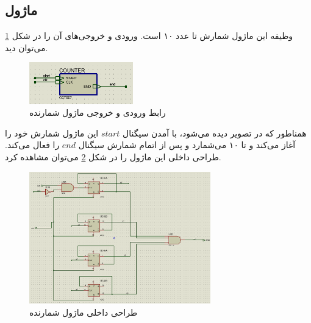 \documentclass[12pt,onecolumn,a4paper,fleqn]{article}
\begin{document}
	\subsection{ماژول }
	وظیفه این ماژول شمارش تا عدد ۱۰ است. ورودی و خروجی‌های آن را در شکل \ref{fig:counter} می‌توان دید.
	\begin{figure}[H]
		\centering
		\includegraphics[width=0.4\textwidth]{source/counter.png}
		\caption{رابط ورودی و خروجی ماژول شمارنده}
		\label{fig:counter}
	\end{figure}
	همناطور که در تصویر دیده می‌شود، با آمدن سیگنال $start$ این ماژول شمارش خود را آغاز می‌کند و تا ۱۰ می‌شمارد و پس از اتمام شمارش سیگنال $end$ را فعال می‌کند. طراحی داخلی این ماژول را در شکل \ref{fig:counter-in} می‌توان مشاهده کرد.
	\begin{figure}[H]
		\centering
		\includegraphics[width=0.7\textwidth]{source/counter-in.png}
		\caption{طراحی داخلی ماژول شمارنده}
		\label{fig:counter-in}
	\end{figure}
	\pagebreak
\end{document}
